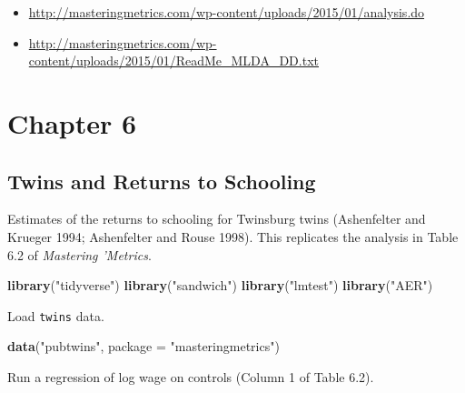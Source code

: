 \documentclass[]{book}
\newenvironment{Shaded}{\begin{snugshade}}{\end{snugshade}}
\newcommand{\DataTypeTok}[1]{\textcolor[rgb]{0.13,0.29,0.53}{#1}}
\newcommand{\KeywordTok}[1]{\textcolor[rgb]{0.13,0.29,0.53}{\textbf{#1}}}
\newcommand{\NormalTok}[1]{#1}
\newcommand{\StringTok}[1]{\textcolor[rgb]{0.31,0.60,0.02}{#1}}
\providecommand{\tightlist}{%
  \setlength{\itemsep}{0pt}\setlength{\parskip}{0pt}}
\theoremstyle{definition}
\theoremstyle{definition}
\theoremstyle{definition}
\theoremstyle{remark}
\begin{document}
\begin{itemize}
\tightlist
\item
  \url{http://masteringmetrics.com/wp-content/uploads/2015/01/analysis.do}
\item
  \url{http://masteringmetrics.com/wp-content/uploads/2015/01/ReadMe_MLDA_DD.txt}
\end{itemize}

\hypertarget{part-chapter-6}{%
\part{Chapter 6}\label{part-chapter-6}}

\hypertarget{twins-and-returns-to-schooling}{%
\chapter{Twins and Returns to
Schooling}\label{twins-and-returns-to-schooling}}

Estimates of the returns to schooling for Twinsburg twins (Ashenfelter
and Krueger 1994; Ashenfelter and Rouse 1998). This replicates the
analysis in Table 6.2 of \emph{Mastering 'Metrics}.

\begin{Shaded}
\begin{Highlighting}[]
\KeywordTok{library}\NormalTok{(}\StringTok{"tidyverse"}\NormalTok{)}
\KeywordTok{library}\NormalTok{(}\StringTok{"sandwich"}\NormalTok{)}
\KeywordTok{library}\NormalTok{(}\StringTok{"lmtest"}\NormalTok{)}
\KeywordTok{library}\NormalTok{(}\StringTok{"AER"}\NormalTok{)}
\end{Highlighting}
\end{Shaded}

Load \texttt{twins} data.

\begin{Shaded}
\begin{Highlighting}[]
\KeywordTok{data}\NormalTok{(}\StringTok{"pubtwins"}\NormalTok{, }\DataTypeTok{package =} \StringTok{"masteringmetrics"}\NormalTok{)}
\end{Highlighting}
\end{Shaded}

Run a regression of log wage on controls (Column 1 of Table 6.2).
\end{document}
